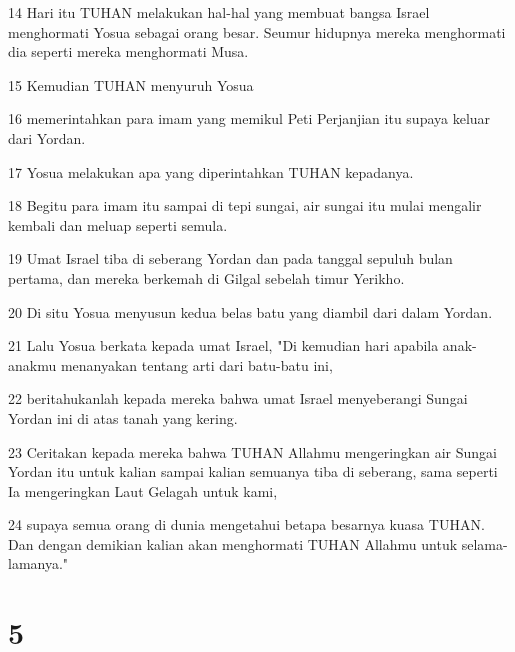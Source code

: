 \par 14 Hari itu TUHAN melakukan hal-hal yang membuat bangsa Israel menghormati Yosua sebagai orang besar. Seumur hidupnya mereka menghormati dia seperti mereka menghormati Musa.
\par 15 Kemudian TUHAN menyuruh Yosua
\par 16 memerintahkan para imam yang memikul Peti Perjanjian itu supaya keluar dari Yordan.
\par 17 Yosua melakukan apa yang diperintahkan TUHAN kepadanya.
\par 18 Begitu para imam itu sampai di tepi sungai, air sungai itu mulai mengalir kembali dan meluap seperti semula.
\par 19 Umat Israel tiba di seberang Yordan dan pada tanggal sepuluh bulan pertama, dan mereka berkemah di Gilgal sebelah timur Yerikho.
\par 20 Di situ Yosua menyusun kedua belas batu yang diambil dari dalam Yordan.
\par 21 Lalu Yosua berkata kepada umat Israel, "Di kemudian hari apabila anak-anakmu menanyakan tentang arti dari batu-batu ini,
\par 22 beritahukanlah kepada mereka bahwa umat Israel menyeberangi Sungai Yordan ini di atas tanah yang kering.
\par 23 Ceritakan kepada mereka bahwa TUHAN Allahmu mengeringkan air Sungai Yordan itu untuk kalian sampai kalian semuanya tiba di seberang, sama seperti Ia mengeringkan Laut Gelagah untuk kami,
\par 24 supaya semua orang di dunia mengetahui betapa besarnya kuasa TUHAN. Dan dengan demikian kalian akan menghormati TUHAN Allahmu untuk selama-lamanya."

\chapter{5}

